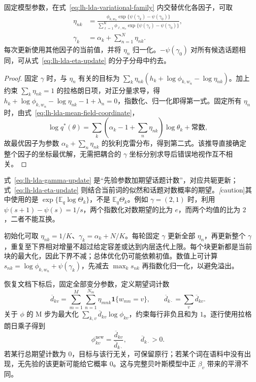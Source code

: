 \begin{proposition}[E 步的坐标更新]
\label{prop:lh-lda-variational-e-step}
固定模型参数，在式~\eqref{eq:lh-lda-variational-family} 内交替优化各因子，可取
\begin{align}
\eta_{nk}&=\frac{\phi_{k,w_n}\exp\{\psi(\gamma_k)-\psi(\gamma_0)\}}
{\sum_{\ell=1}^K\phi_{\ell,w_n}\exp\{\psi(\gamma_\ell)-\psi(\gamma_0)\}},
\label{eq:lh-lda-eta-update}\\
\gamma_k&=\alpha_k+\sum_{n=1}^N\eta_{nk}.
\label{eq:lh-lda-gamma-update}
\end{align}
每次更新使用其他因子的当前值，并将 $\eta_n$ 归一化。$-\psi(\gamma_0)$ 对所有候选话题相同，可从式~\eqref{eq:lh-lda-eta-update} 的分子分母中约去。
\end{proposition}
\begin{proof}
固定 $\gamma$ 时，与 $\eta_n$ 有关的目标为 $\sum_k\eta_{nk}(h_k+\log\phi_{k,w_n}-\log\eta_{nk})$。加上约束 $\sum_k\eta_{nk}=1$ 的拉格朗日项，对正分量求导，得 $h_k+\log\phi_{k,w_n}-\log\eta_{nk}-1+\lambda_n=0$，指数化、归一化即得第一式。固定所有 $\eta_n$ 时，由式~\eqref{eq:lh-lda-mean-field-coordinate}，
\[
\log q^*(\theta)
=\sum_k\left(\alpha_k-1+\sum_n\eta_{nk}\right)\log\theta_k+\text{常数},
\]
故最优因子为参数 $\alpha_k+\sum_n\eta_{nk}$ 的狄利克雷分布，得到第二式。该推导直接确定整个因子的坐标最优解，无需把耦合的 $\gamma$ 坐标分别求导后错误地视作互不相关。
\end{proof}

式~\eqref{eq:lh-lda-gamma-update} 是“先验参数加期望话题计数”，对应共轭更新；式~\eqref{eq:lh-lda-eta-update} 则结合当前词的似然和话题对数概率的期望。\emph[caution]{其中使用的是 $\exp\{\mathbb E_q\log\Theta_k\}$，不是 $\mathbb E_q\Theta_k$。}例如 $\gamma=(2,1)$ 时，利用 $\psi(s+1)-\psi(s)=1/s$，两个指数化对数期望的比为 $e$，而两个均值的比为 $2$，二者不能互换。

初始化可取 $\eta_{nk}=1/K$、$\gamma_k=\alpha_k+N/K$。每轮固定 $\gamma$ 更新全部 $\eta_n$，再更新整个 $\gamma$，重复至下界相对增量不超过给定容差或达到内层迭代上限。每个块更新都是当前块的最大化，因此下界不减；总体优化仍可能依赖初值。数值上可计算 $s_{nk}=\log\phi_{k,w_n}+\psi(\gamma_k)$，先减去 $\max_ks_{nk}$ 再指数化归一化，以避免溢出。

恢复文档下标后，固定全部变分参数，定义期望词计数
\begin{equation}
\overline d_{kv}=\sum_{m=1}^M\sum_{n=1}^{N_m}
\eta_{mnk}\mathbf1\{w_{mn}=v\},\qquad
\overline d_{k\cdot}=\sum_v\overline d_{kv}.
\label{eq:lh-lda-expected-counts}
\end{equation}
关于 $\phi$ 的 M 步为最大化 $\sum_{k,v}\overline d_{kv}\log\phi_{kv}$，约束每行非负且和为 $1$。逐行使用拉格朗日乘子得到
\begin{equation}
\phi_{kv}^{\mathrm{new}}=\frac{\overline d_{kv}}{\overline d_{k\cdot}},
\qquad\overline d_{k\cdot}>0.
\label{eq:lh-lda-phi-m-step}
\end{equation}
若某行总期望计数为 $0$，目标与该行无关，可保留原行；若某个词在语料中没有出现，无先验的该更新可能给它概率 $0$。这与完整贝叶斯模型中正 $\beta_v$ 带来的平滑不同。

